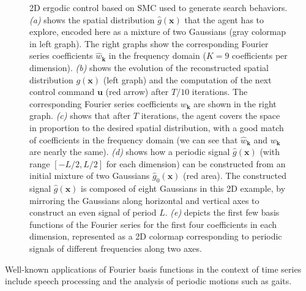 \documentclass[10pt,a4paper]{article} %
\begin{document}
\begin{figure}
\caption{
2D ergodic control based on SMC used to generate search behaviors.
\emph{(a)} shows the spatial distribution $\hat{g}(\bm{x})$ that the agent has to explore, encoded here as a mixture of two Gaussians (gray colormap in left graph). The right graphs show the corresponding Fourier series coefficients $\hat{w}_{\bm{k}}$ in the frequency domain ($K=9$ coefficients per dimension). \emph{(b)} shows the evolution of the reconstructed spatial distribution $g(\bm{x})$ (left graph) and the computation of the next control command $\bm{u}$ (red arrow) after $T/10$ iterations. The corresponding Fourier series coefficients $w_{\bm{k}}$ are shown in the right graph. \emph{(c)} shows that after $T$ iterations, the agent covers the space in proportion to the desired spatial distribution, with a good match of coefficients in the frequency domain (we can see that $\hat{w}_{\bm{k}}$ and $w_{\bm{k}}$ are nearly the same). \emph{(d)} shows how a periodic signal $\hat{g}(\bm{x})$ (with range $[-L/2,L/2]$ for each dimension) can be constructed from an initial mixture of two Gaussians $\hat{g}_0(\bm{x})$ (red area). The constructed signal $\hat{g}(\bm{x})$ is composed of eight Gaussians in this 2D example, by mirroring the Gaussians along horizontal and vertical axes to construct an even signal of period $L$. \emph{(e)} depicts the first few basis functions of the Fourier series for the first four coefficients in each dimension, represented as a 2D colormap corresponding to periodic signals of different frequencies along two axes.
\label{fig:ergodic_SMC}
}
\end{figure}

Well-known applications of Fourier basis functions in the context of time series include speech processing and the analysis of periodic motions such as gaits. 
\end{document}
